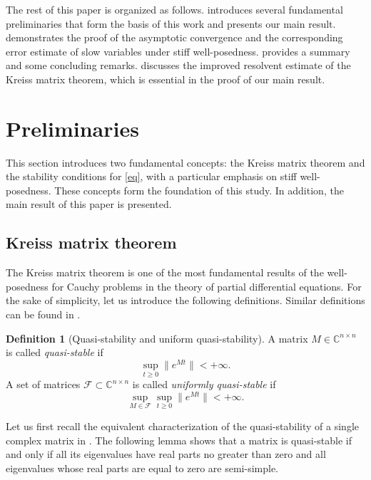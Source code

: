 \documentclass{article}
\theoremstyle{plain}%
\theoremstyle{definition}%
\newtheorem{definition}{Definition}%
\theoremstyle{remark}%
\newcommand{\bC}{\mathbb{C}}
\newcommand{\cF}{\mathcal{F}}
\newcommand{\+}[1]{{\bm{#1}}}
\newcommand{\norm}[1]{\|{#1}\|}
\begin{document}
The rest of this paper is organized as follows. 
 introduces several fundamental preliminaries 
that form the basis of this work and presents our main result. 
 demonstrates the proof of the asymptotic 
convergence and the corresponding error estimate of slow variables 
under stiff well-posedness.
 provides a summary and some concluding remarks. 
 discusses the improved resolvent estimate of the 
Kreiss matrix theorem, which is essential in the proof of our main 
result.







\section{Preliminaries}
\label{sec:preliminaries}
This section introduces two fundamental concepts: the Kreiss matrix 
theorem and the stability conditions for \cref{eq}, with a particular 
emphasis on stiff well-posedness.
These concepts form the foundation of this study. In addition, 
the main result of this paper is presented.


\subsection{Kreiss matrix theorem}
The Kreiss matrix theorem 
\cite{kreiss_uber_1959,kreiss_initial-boundary_2004} 
is one of the most fundamental results of 
the well-posedness for Cauchy problems in the theory of partial 
differential equations.
For the sake of simplicity, let us introduce the following 
definitions. 
Similar definitions can be found in \cite{Yong_singular_1992}.
\begin{definition}[Quasi-stability and uniform quasi-stability]
  A matrix $M \in \bC^{n \times n}$ is called \textit{quasi-stable} 
  if 
  \begin{displaymath}
    \sup_{t \ge 0} \norm{e^{M t}} < + \infty.
  \end{displaymath}
  A set of matrices $\cF \subset \bC^{n \times n}$ is 
  called \textit{uniformly quasi-stable} if 
  \begin{displaymath}
    \sup_{M \in \cF} \sup_{t \ge 0} \norm{e^{M t}} < + \infty.
  \end{displaymath}
\end{definition}

Let us first recall the equivalent characterization of 
the quasi-stability of a single complex matrix in 
\cite{kreiss_initial-boundary_2004}.
The following lemma shows that a matrix is quasi-stable if and only 
if all its eigenvalues have real parts no greater than zero and all 
eigenvalues whose real parts are equal to zero are semi-simple.
\end{document}
